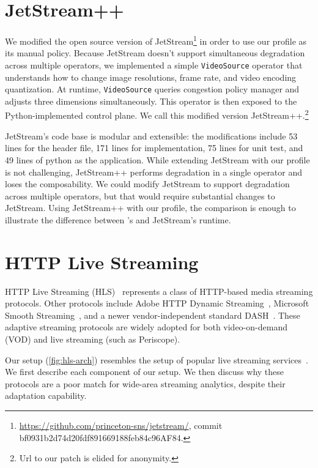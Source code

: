 \documentclass[twocolumn, 9pt]{article}
\begin{document}
\section{JetStream++}
\label{appendix:jetstream++}

We modified the open source version of
JetStream\footnote{\url{https://github.com/princeton-sns/jetstream/}, commit
  bf0931b2d74d20fdf891669188feb84c96AF84.} in order to use our profile as its
manual policy. Because JetStream doesn't support simultaneous degradation across
multiple operators, we implemented a simple \texttt{VideoSource} operator that
understands how to change image resolutions, frame rate, and video encoding
quantization. At runtime, \texttt{VideoSource} queries congestion policy manager
and adjusts three dimensions simultaneously. This operator is then exposed to
the Python-implemented control plane. We call this modified version
JetStream++.\footnote{Url to our patch is elided for anonymity.}


JetStream's code base is modular and extensible: the modifications include 53
lines for the header file, 171 lines for implementation, 75 lines for unit test,
and 49 lines of python as the application. While extending JetStream with our
profile is not challenging, JetStream++ performs degradation in a single
operator and loses the composability. We could modify JetStream to support
degradation across multiple operators, but that would require substantial
changes to JetStream. Using JetStream++ with our profile, the comparison is
enough to illustrate the difference between \sysname{}'s and JetStream's
runtime.

\section{HTTP Live Streaming}
\label{appendix:hls}

HTTP Live Streaming (HLS)~\cite{pantos2016http} represents a class of HTTP-based
media streaming protocols. Other protocols include Adobe HTTP Dynamic
Streaming~\cite{adobestreaming}, Microsoft Smooth
Streaming~\cite{zambelli2009iis}, and a newer vendor-independent standard
DASH~\cite{michalos2012dynamic, sodagar2011mpeg}. These adaptive streaming
protocols are widely adopted for both video-on-demand (VOD) and live streaming
(such as Periscope).

Our setup (\autoref{fig:hls-arch}) resembles the setup of popular live streaming
services~\cite{wang2016anatomy}. We first describe each component of our
setup. We then discuss why these protocols are a poor match for wide-area
streaming analytics, despite their adaptation capability.
\end{document}
